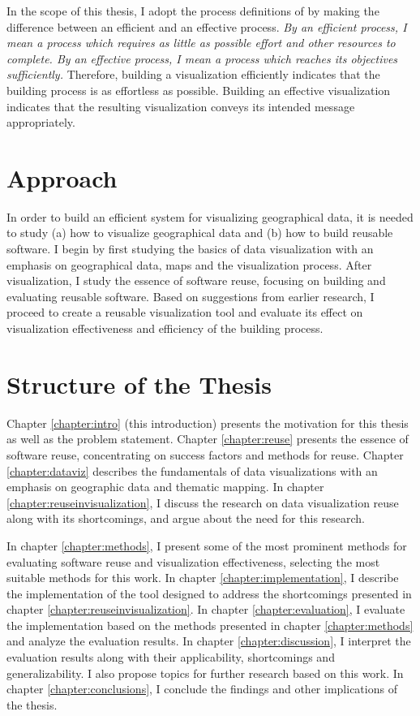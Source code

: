 In the scope of this thesis, I adopt the process definitions of \citet{van_wijk_value_2005} by making the difference between an efficient and an effective process. \emph{By an efficient process, I mean a process which requires as little as possible effort and other resources to complete. By an effective process, I mean a process which reaches its objectives sufficiently.} Therefore, building a visualization efficiently indicates that the building process is as effortless as possible. Building an effective visualization indicates that the resulting visualization conveys its intended message appropriately.



\section{Approach}

In order to build an efficient system for visualizing geographical data, it is needed to study (a) how to visualize geographical data and (b) how to build reusable software. I begin by first studying the basics of data visualization with an emphasis on geographical data, maps and the visualization process. After visualization, I study the essence of software reuse, focusing on building and evaluating reusable software. Based on suggestions from earlier research, I proceed to create a reusable visualization tool and evaluate its effect on visualization effectiveness and efficiency of the building process.

\section{Structure of the Thesis}
\label{section:structure} 

Chapter \ref{chapter:intro} (this introduction) presents the motivation for this thesis as well as the problem statement. Chapter \ref{chapter:reuse} presents the essence of software reuse, concentrating on success factors and methods for reuse. Chapter \ref{chapter:dataviz} describes the fundamentals of data visualizations with an emphasis on geographic data and thematic mapping. In chapter \ref{chapter:reuseinvisualization}, I discuss the research on data visualization reuse along with its shortcomings, and argue about the need for this research.

In chapter \ref{chapter:methods}, I present some of the most prominent methods for evaluating software reuse and visualization effectiveness, selecting the most suitable methods for this work. In chapter \ref{chapter:implementation}, I describe the implementation of the tool designed to address the shortcomings presented in chapter \ref{chapter:reuseinvisualization}. In chapter \ref{chapter:evaluation}, I evaluate the implementation based on the methods presented in chapter \ref{chapter:methods} and analyze the evaluation results. In chapter \ref{chapter:discussion}, I interpret the evaluation results along with their applicability, shortcomings and generalizability. I also propose topics for further research based on this work. In chapter \ref{chapter:conclusions}, I conclude the findings and other implications of the thesis.